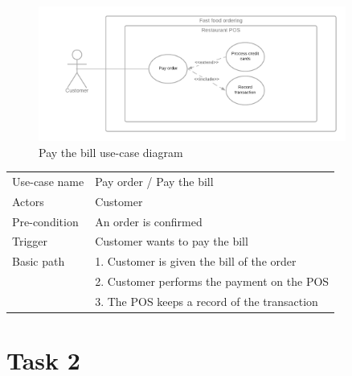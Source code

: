 \documentclass[a4paper]{article}
\numberwithin{equation}{section}
\begin{document}
\begin{figure}[H]
  \centering
  \includegraphics[width=0.9\textwidth]{./assets/t1/PayOrder.png}
  \caption{Pay the bill use-case diagram}
\end{figure}

\begin{center}
  \begin{tabular}{*{2}{l}}
    \toprule
    Use-case name  & Pay order / Pay the bill                     \\
    Actors         & Customer                                     \\
    Pre-condition  & An order is confirmed                        \\
    Trigger        & Customer wants to pay the bill               \\
    Basic path     & 1. Customer is given the bill of the order   \\
                   & 2. Customer performs the payment on the POS  \\
                   & 3. The POS keeps a record of the transaction \\
    \bottomrule
  \end{tabular}
\end{center}

\newpage

\section{Task 2}
\end{document}
